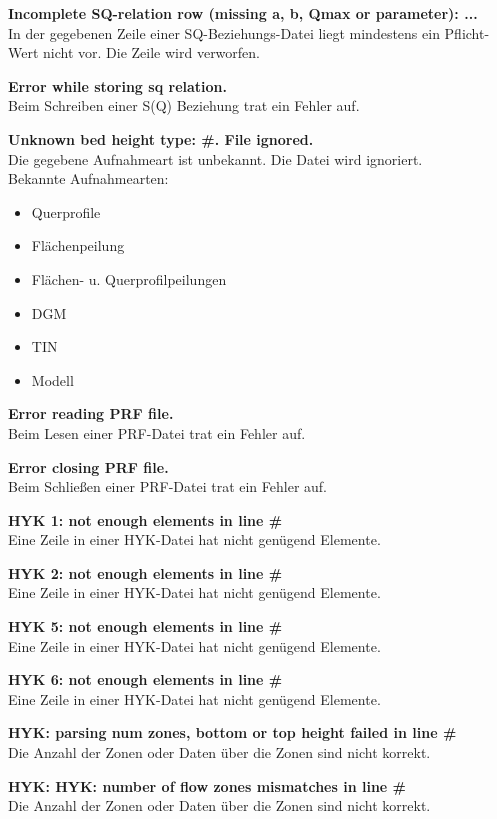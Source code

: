 \textbf{Incomplete SQ-relation row (missing a, b, Qmax or parameter): ...}
\\In der gegebenen Zeile einer SQ-Beziehungs-Datei liegt mindestens
ein Pflicht-Wert nicht vor. Die Zeile wird verworfen.

\textbf{Error while storing sq relation.}
\\Beim Schreiben einer S(Q) Beziehung trat ein Fehler auf.

\textbf{Unknown bed height type: \#. File ignored.}
\\Die gegebene Aufnahmeart ist unbekannt. Die Datei wird ignoriert.
\\Bekannte Aufnahmearten:
\begin{itemize}
\item Querprofile
\item Flächenpeilung
\item Flächen- u. Querprofilpeilungen
\item DGM
\item TIN
\item Modell
\end{itemize}

\textbf{Error reading PRF file.}
\\Beim Lesen einer PRF-Datei trat ein Fehler auf.

\textbf{Error closing PRF file.}
\\Beim Schließen einer PRF-Datei trat ein Fehler auf.

\textbf{HYK 1: not enough elements in line \#}
\\Eine Zeile in einer HYK-Datei hat nicht genügend Elemente.

\textbf{HYK 2: not enough elements in line \#}
\\Eine Zeile in einer HYK-Datei hat nicht genügend Elemente.

\textbf{HYK 5: not enough elements in line \#}
\\Eine Zeile in einer HYK-Datei hat nicht genügend Elemente.

\textbf{HYK 6: not enough elements in line \#}
\\Eine Zeile in einer HYK-Datei hat nicht genügend Elemente.

\textbf{HYK: parsing num zones, bottom or top height failed in line \#}
\\Die Anzahl der Zonen oder Daten über die Zonen sind nicht korrekt.

\textbf{HYK: HYK: number of flow zones mismatches in line \#}
\\Die Anzahl der Zonen oder Daten über die Zonen sind nicht korrekt.

